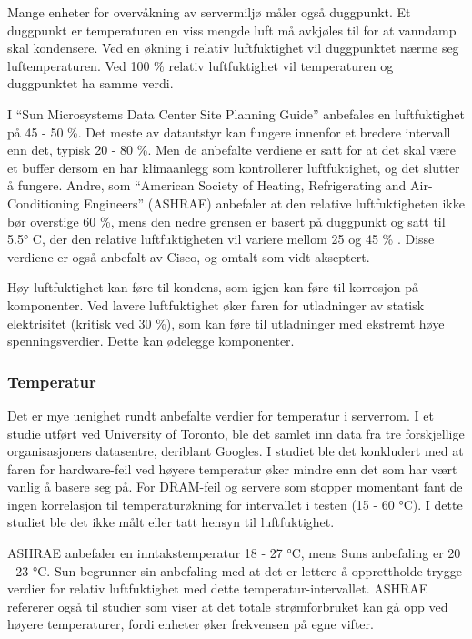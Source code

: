 Mange enheter for overvåkning av servermiljø måler også duggpunkt. Et duggpunkt er temperaturen en viss mengde luft må avkjøles til for at vanndamp skal kondensere. Ved en økning i relativ luftfuktighet vil duggpunktet nærme seg luftemperaturen. Ved 100 \% relativ luftfuktighet vil temperaturen og duggpunktet ha samme verdi. 

I ``Sun Microsystems Data Center Site Planning Guide'' anbefales en luftfuktighet på 45 - 50 \%. Det meste av datautstyr kan fungere innenfor et bredere intervall enn det, typisk 20 - 80 \%. Men de anbefalte verdiene er satt for at det skal være et buffer dersom en har klimaanlegg som kontrollerer luftfuktighet, og det slutter å fungere\cite{planningserver}. Andre, som ``American Society of Heating, Refrigerating and Air-Conditioning Engineers'' (ASHRAE) anbefaler at den relative luftfuktigheten ikke bør overstige 60 \%, mens den nedre grensen er basert på duggpunkt og satt til 5.5° C, der den relative luftfuktigheten vil variere mellom 25 og 45 \% \cite{envguide}. Disse verdiene er også anbefalt av Cisco\cite{envguidecisco}, og omtalt som vidt akseptert. 

Høy luftfuktighet kan føre til kondens, som igjen kan føre til korrosjon på komponenter. Ved lavere luftfuktighet øker faren for utladninger av statisk elektrisitet (kritisk ved 30 \%), som kan føre til utladninger med ekstremt høye spenningsverdier. Dette kan ødelegge komponenter.

\subsubsection{Temperatur}
Det er mye uenighet rundt anbefalte verdier for temperatur i serverrom. I et studie utført ved University of Toronto\cite{torontopaper}, ble det samlet inn data fra tre forskjellige organisasjoners datasentre, deriblant Googles. I studiet ble det konkludert med at faren for hardware-feil ved høyere temperatur øker mindre enn det som har vært vanlig å basere seg på. For DRAM-feil og servere som stopper momentant fant de ingen korrelasjon til temperaturøkning for intervallet i testen (15 - 60 °C). I dette studiet ble det ikke målt eller tatt hensyn til luftfuktighet. 

ASHRAE anbefaler en inntakstemperatur 18 - 27 °C, mens Suns anbefaling er 20 - 23 °C. Sun begrunner sin anbefaling med at det er lettere å opprettholde trygge verdier for relativ luftfuktighet med dette temperatur-intervallet. ASHRAE refererer også til studier som viser at det totale strømforbruket kan gå opp ved høyere temperaturer, fordi enheter øker frekvensen på egne vifter\cite{datacentertemp}.

